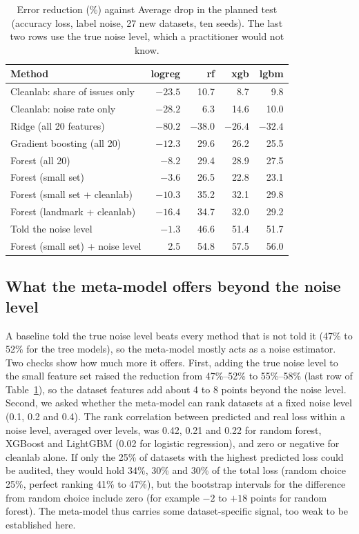 \documentclass[conference]{IEEEtran}
\begin{document}
\begin{table}[!t]
\centering
\caption{Error reduction (\%) against Average drop in the planned test (accuracy loss, label noise, 27 new datasets, ten seeds). The last two rows use the true noise level, which a practitioner would not know.}
\label{tab:comp}
\footnotesize
\setlength{\tabcolsep}{4pt}
\begin{tabular}{@{}lrrrr@{}}
\toprule
Method & logreg & rf & xgb & lgbm \\
\midrule
Cleanlab: share of issues only & $-23.5$ & 10.7 & 8.7 & 9.8 \\
Cleanlab: noise rate only & $-28.2$ & 6.3 & 14.6 & 10.0 \\
Ridge (all 20 features) & $-80.2$ & $-38.0$ & $-26.4$ & $-32.4$ \\
Gradient boosting (all 20) & $-12.3$ & 29.6 & 26.2 & 25.5 \\
Forest (all 20) & $-8.2$ & 29.4 & 28.9 & 27.5 \\
Forest (small set) & $-3.6$ & 26.5 & 22.8 & 23.1 \\
Forest (small set + cleanlab) & $-10.3$ & 35.2 & 32.1 & 29.8 \\
Forest (landmark + cleanlab) & $-16.4$ & 34.7 & 32.0 & 29.2 \\
\midrule
Told the noise level & $-1.3$ & 46.6 & 51.4 & 51.7 \\
Forest (small set) + noise level & 2.5 & 54.8 & 57.5 & 56.0 \\
\bottomrule
\end{tabular}
\end{table}

\subsection{What the meta-model offers beyond the noise level}
A baseline told the true noise level beats every method that is not told it (47\% to 52\% for the tree models), so the meta-model mostly acts as a noise estimator. Two checks show how much more it offers. First, adding the true noise level to the small feature set raised the reduction from 47\%--52\% to 55\%--58\% (last row of Table~\ref{tab:comp}), so the dataset features add about 4 to 8 points beyond the noise level. Second, we asked whether the meta-model can rank datasets at a fixed noise level (0.1, 0.2 and 0.4). The rank correlation between predicted and real loss within a noise level, averaged over levels, was 0.42, 0.21 and 0.22 for random forest, XGBoost and LightGBM (0.02 for logistic regression), and zero or negative for cleanlab alone. If only the 25\% of datasets with the highest predicted loss could be audited, they would hold 34\%, 30\% and 30\% of the total loss (random choice 25\%, perfect ranking 41\% to 47\%), but the bootstrap intervals for the difference from random choice include zero (for example $-2$ to $+18$ points for random forest). The meta-model thus carries some dataset-specific signal, too weak to be established here.
\end{document}
